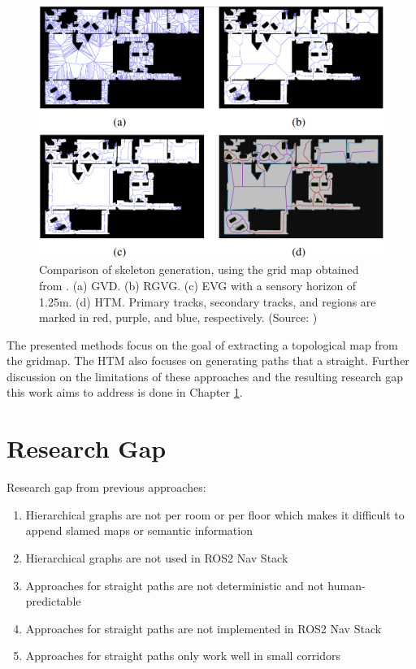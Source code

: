 \begin{figure}[h]
    \centering
    \includegraphics[width=\textwidth]{figures/20_state_of_the_art/htm_global_comparison.png}
    \caption[Comparison of generated topological maps]{Comparison of skeleton generation, using the grid map obtained from \cite{beeson_towards_2005}. (a) GVD. (b) RGVG. (c) EVG with a sensory horizon of 1.25m. (d) HTM. Primary tracks, secondary tracks, and regions are marked in red, purple, and blue, respectively. (Source: \cite{hou_straight_2021})}
    \label{fig:htm_global_comparison}
\end{figure}

The presented methods focus on the goal of extracting a topological map from the gridmap. The HTM also focuses on generating paths that a straight. Further discussion on the limitations of these approaches and the resulting research gap this work aims to address is done in Chapter \ref{sec:research_gap}. 

\section{Research Gap}
\label{sec:research_gap}

Research gap from previous approaches:
\begin{enumerate}
    \item Hierarchical graphs are not per room or per floor which makes it difficult to append slamed maps or semantic information
    \item Hierarchical graphs are not used in ROS2 Nav Stack
    \item Approaches for straight paths are not deterministic and not human-predictable
    \item Approaches for straight paths are not implemented in ROS2 Nav Stack
    \item Approaches for straight paths only work well in small corridors
\end{enumerate}

